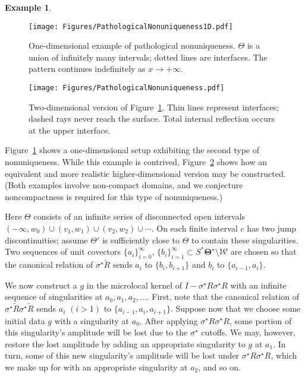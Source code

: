 \documentclass[10pt]{article}
\theoremstyle{plain}
\theoremstyle{definition}
\newtheorem{example}{Example}
\theoremstyle{remark}
\numberwithin{theorem}{section}
\numberwithin{example}{section}
\numberwithin{equation}{section}
\numberwithin{figure}{section}
\newcommand\bTheta{\boldsymbol\Theta}
\begin{document}
\begin{example}

\begin{figure}
\centering

\texttt{[image: Figures/PathologicalNonuniqueness1D.pdf]}

\caption[One-dimensional example of the second type of uniqueness]{One-dimensional example of pathological nonuniqueness. $\Theta$ is a union of infinitely many intervals; dotted lines are interfaces. The pattern continues indefinitely as $x\to +\infty$.}

\label{f:pathological-ml-nonuniqueness-1D}
\end{figure}

\begin{figure}
\centering

\texttt{[image: Figures/PathologicalNonuniqueness.pdf]}

\caption{Two-dimensional version of Figure~\ref{f:pathological-ml-nonuniqueness-1D}. Thin lines represent interfaces; dashed rays never reach the surface. Total internal reflection occurs at the upper interface.}

\label{f:pathological-ml-nonuniqueness-2D}
\end{figure}

Figure~\ref{f:pathological-ml-nonuniqueness-1D} shows a one-dimensional setup exhibiting the second type of nonuniqueness. While this example is contrived, Figure~\ref{f:pathological-ml-nonuniqueness-2D} shows how an equivalent and more realistic higher-dimensional version may be constructed. (Both examples involve non-compact domains, and we conjecture noncompactness is required for this type of nonuniqueness.)

Here $\Theta$ consists of an infinite series of disconnected open intervals $(-\infty,w_0)\cup(v_1,w_1)\cup(v_2,w_2)\cup\dotsb$. On each finite interval $c$ has two jump discontinuities; assume $\Theta'$ is sufficiently close to $\Theta$ to contain these singularities.
Two sequences of unit covectors $\{a_i\}_{i=0}^\infty,\,\{b_i\}_{i=1}^\infty\subset S^*\bTheta^\star\setminus\mathcal W$ are chosen so that the canonical relation of $\sigma^\star\tilde R$ sends $a_i$ to $\{b_i,b_{i+1}\}$ and $b_i$ to $\{a_{i-1},a_i\}$. 

We now construct a $g$ in the microlocal kernel of $I-\sigma^\star R\sigma^\star R$ with an infinite sequence of singularities at $a_0,a_1,a_2,\dotsc$. First, note that the canonical relation of $\sigma^\star \tilde R\sigma^\star \tilde R$ sends $a_i$ $(i>1)$ to $\{a_{i-1},a_i,a_{i+1}\}$. Suppose now that we choose some initial data $g$ with a singularity at $a_0$. After applying $\sigma^\star R\sigma^\star R$, some portion of this singularity's amplitude will be lost due to the $\sigma^\star$ cutoffs. We may, however, restore the lost amplitude by adding an appropriate singularity to $g$ at $a_1$. In turn, some of this new singularity's amplitude will be lost under $\sigma^\star R\sigma^\star R$, which we make up for with an appropriate singularity at $a_2$, and so on.


\end{example}
\end{document}
